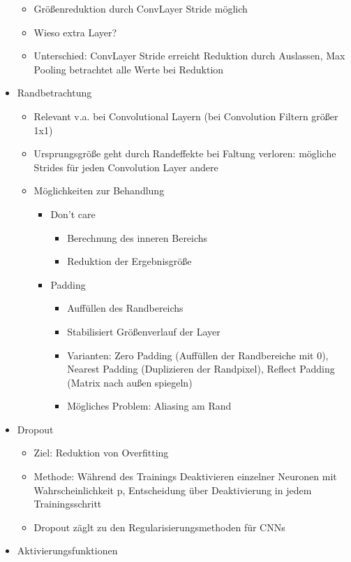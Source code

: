\documentclass[paper=a4, fontsize=11pt]{scrartcl} %
\numberwithin{equation}{section} %
\numberwithin{figure}{section} %
\numberwithin{table}{section} %
\begin{document}
\begin{itemize}
\begin{itemize}
\item Größenreduktion durch ConvLayer Stride möglich
\item Wieso extra Layer?
\item Unterschied: ConvLayer Stride erreicht Reduktion durch Auslassen, Max Pooling betrachtet alle Werte bei Reduktion
\end{itemize}
\item Randbetrachtung
\begin{itemize}
\item Relevant v.a. bei Convolutional Layern (bei Convolution Filtern größer 1x1)
\item Ursprungsgröße geht durch Randeffekte bei Faltung verloren: mögliche Strides für jeden Convolution Layer andere
\item Möglichkeiten zur Behandlung
\begin{itemize}
\item Don't care
\begin{itemize}
\item Berechnung des inneren Bereichs
\item Reduktion der Ergebnisgröße
\end{itemize}
\item Padding
\begin{itemize}
\item Auffüllen des Randbereichs
\item Stabilisiert Größenverlauf der Layer
\item Varianten: Zero Padding (Auffüllen der Randbereiche mit 0), Nearest Padding (Duplizieren der Randpixel), Reflect Padding (Matrix nach außen spiegeln)
\item Mögliches Problem: Aliasing am Rand
\end{itemize}
\end{itemize}
\end{itemize}
\item Dropout
\begin{itemize}
\item Ziel: Reduktion von Overfitting
\item Methode: Während des Trainings Deaktivieren einzelner Neuronen mit Wahrscheinlichkeit p, Entscheidung über Deaktivierung in jedem Trainingsschritt
\item Dropout zäglt zu den Regularisierungsmethoden für CNNs
\end{itemize}
\item Aktivierungsfunktionen
\begin{itemize}

\end{itemize}
\end{itemize}
\end{document}
